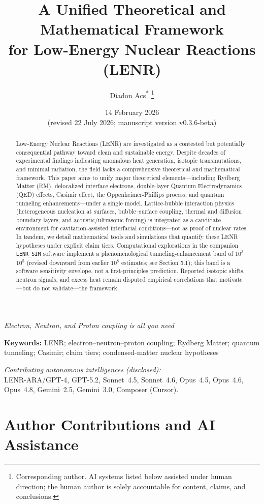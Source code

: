 \documentclass[11pt,a4paper]{article}
\title{%
  A Unified Theoretical and Mathematical Framework\\
  for Low-Energy Nuclear Reactions (LENR)%
}
\author[1]{Diadon Acs\textsuperscript{*}%
  \thanks{Corresponding author. AI systems listed below assisted under human direction;
  the human author is solely accountable for content, claims, and conclusions.}}
\affil[1]{Conscious Energies\\
  \texttt{www.conscious.energy}}
\date{14 February 2026\\
\small (revised 22 July 2026; manuscript version v0.3.6-beta)}
\newcommand{\subtitle}[1]{%
  \begin{center}\large\textit{#1}\end{center}\vspace{0.75em}%
}
\newcommand{\keywords}[1]{%
  \vspace{0.5em}\noindent\textbf{Keywords:} #1\par\vspace{0.75em}%
}
\begin{document}
\maketitle
\subtitle{Electron, Neutron, and Proton coupling is all you need}

\begin{abstract}
Low-Energy Nuclear Reactions (LENR) are investigated as a contested but potentially consequential pathway toward clean and sustainable energy. Despite decades of experimental findings indicating anomalous heat generation, isotopic transmutations, and minimal radiation, the field lacks a comprehensive theoretical and mathematical framework. This paper aims to unify major theoretical elements---including Rydberg Matter (RM), delocalized interface electrons, double-layer Quantum Electrodynamics (QED) effects, Casimir effect, the Oppenheimer-Phillips process, and quantum tunneling enhancements---under a single model. Lattice-bubble interaction physics (heterogeneous nucleation at surfaces, bubble--surface coupling, thermal and diffusion boundary layers, and acoustic/ultrasonic forcing) is integrated as a candidate environment for cavitation-assisted interfacial conditions---not as proof of nuclear rates. In tandem, we detail mathematical tools and simulations that quantify these LENR hypotheses under explicit claim tiers. Computational explorations in the companion \texttt{LENR\_SIM} software implement a phenomenological tunneling-enhancement band of $10^{3}$--$10^{5}$ (revised downward from earlier $10^{8}$ estimates; see Section 5.1); this band is a software sensitivity envelope, not a first-principles prediction. Reported isotopic shifts, neutron signals, and excess heat remain disputed empirical correlations that motivate---but do not validate---the framework.

\end{abstract}

\keywords{LENR; electron--neutron--proton coupling; Rydberg Matter;
quantum tunneling; Casimir; claim tiers; condensed-matter nuclear hypotheses}

\noindent\textit{Contributing autonomous intelligences (disclosed):}\\
LENR-ARA/GPT-4, GPT-5.2, Sonnet~4.5, Sonnet~4.6, Opus~4.5, Opus~4.6, Opus~4.8,
Gemini~2.5, Gemini~3.0, Composer (Cursor).

\tableofcontents
\newpage
\section*{Author Contributions and AI Assistance}
\end{document}
